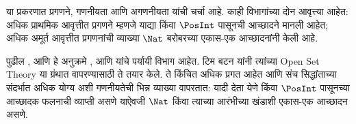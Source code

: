 \documentclass[../../../include/open-logic-chapter]{subfiles}
\begin{document}

\begin{editorial}
या प्रकरणात प्रगणने, गणनीयता आणि अगणनीयता यांची चर्चा आहे.
काही विभागांच्या दोन आवृत्त्या आहेत: अधिक प्राथमिक आवृत्तीत प्रगणने
म्हणजे याद्या किंवा $\PosInt$ पासूनची आच्छादने मानली आहेत;
अधिक अमूर्त आवृत्तीत प्रगणनांची व्याख्या $\Nat$ बरोबरच्या
एकास-एक आच्छादनांनी केली आहे.
\end{editorial}











\begin{editorial}
पुढील ,
 आणि 
हे अनुक्रमे ,
 आणि 
यांचे पर्यायी विभाग आहेत. टिम बटन यांनी त्यांच्या Open Set Theory
या ग्रंथात वापरण्यासाठी ते तयार केले. ते किंचित अधिक प्रगत आहेत आणि
संच सिद्धांताच्या संदर्भात अधिक योग्य अशी गणनीयतेची भिन्न व्याख्या
वापरतात: यादी देता येणे किंवा $\PosInt$ पासूनच्या आच्छादक फलनाची
व्याप्ती असणे याऐवजी $\Nat$ किंवा त्याच्या आरंभीच्या खंडाशी एकास-एक
आच्छादन असणे.
\end{editorial}


\OLEndChapterHook
\end{document}
